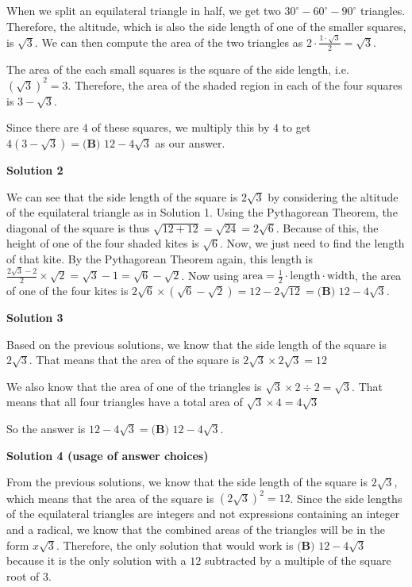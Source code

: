 \begin{enumerate}
 When we split an equilateral triangle in half, we get two $30^{\circ}-60^{\circ}-90^{\circ}$ triangles. Therefore, the altitude, which is also the side length of one of the smaller squares, is $\sqrt{3}$. We can then compute the area of the two triangles as $2 \cdot \frac{1 \cdot \sqrt{3}}{2} = \sqrt{3}$.

 The area of the each small squares is the square of the side length, i.e. $\left(\sqrt{3}\right)^2 = 3$. Therefore, the area of the shaded region in each of the four squares is $3 - \sqrt{3}$.

 Since there are $4$ of these squares, we multiply this by $4$ to get $4\left(3 - \sqrt{3}\right) = \boxed{\textbf{(B) } 12 - 4\sqrt{3}}$ as our answer.

 



\textbf{Solution 2}

We can see that the side length of the square is $2\sqrt{3}$ by considering the altitude of the equilateral triangle as in Solution 1. Using the Pythagorean Theorem, the diagonal of the square is thus $\sqrt{12+12}=\sqrt{24}=2\sqrt{6}$. Because of this, the height of one of the four shaded kites is $\sqrt{6}$. Now, we just need to find the length of that kite. By the Pythagorean Theorem again, this length is $\frac{2\sqrt{3} - 2}{2} \times \sqrt{2} = \sqrt{3} - 1 = \sqrt{6} - \sqrt{2}$. Now using $\text{area} = \frac{1}{2} \cdot \text{length} \cdot \text{width}$, the area of one of the four kites is $2 \sqrt{6} \times \left(\sqrt{6}-\sqrt{2}\right) = 12 - 2\sqrt{12} = \boxed{\textbf{(B) } 12 - 4\sqrt{3}}$.

 



\textbf{Solution 3}

Based on the previous solutions, we know that the side length of the square is $2\sqrt{3}$. That means that the area of the square is $2\sqrt{3} \times 2\sqrt{3} = 12$

 We also know that the area of one of the triangles is $\sqrt{3} \times 2 \div 2 = \sqrt{3}$. That means that all four triangles have a total area of $\sqrt{3} \times 4 = 4\sqrt{3}$

 So the answer is $12 - 4\sqrt{3} = \boxed{\textbf{(B) } 12 - 4\sqrt{3}}$.

 



\textbf{Solution 4 (usage of answer choices)}

From the previous solutions, we know that the side length of the square is $2\sqrt{3}$, which means that the area of the square is $(2\sqrt{3})^2 = 12$. Since the side lengths of the equilateral triangles are integers and not expressions containing an integer and a radical, we know that the combined areas of the triangles will be in the form $x\sqrt{3}$. Therefore, the only solution that would work is $\boxed{\textbf{(B) }12 - 4\sqrt{3}}$ because it is the only solution with a $12$ subtracted by a multiple of the square root of $3$.


\end{enumerate}
